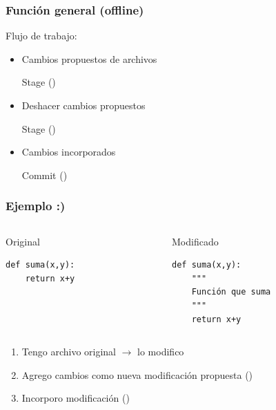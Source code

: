 \documentclass[14pt,aspectratio=169,xcolor=dvipsnames]{beamer}
\begin{document}
\begin{frame}\frametitle{Función general (offline)}
    Flujo de trabajo:
    \begin{itemize}
        \item Cambios propuestos de archivos \phantom{ }
            
            \begin{minipage}{0.35\textwidth}
            \begin{block}{}
                Stage \hfill()
            \end{block}
            \end{minipage}
        \item Deshacer cambios propuestos \phantom{ }
            
            \begin{minipage}{0.35\textwidth}
            \begin{block}{}
                Stage \hfill()
            \end{block}
            \end{minipage}

        \item Cambios incorporados \phantom{ }

            \begin{minipage}{0.35\textwidth}
            \begin{block}{}
                Commit \hfill()
            \end{block}
            \end{minipage}
    \end{itemize}
\end{frame}
\begin{frame}[t,fragile]\frametitle{Ejemplo :)}
  \begin{columns}
    \begin{column}[t]{0.45\textwidth}
        Original
        \begin{verbatim}
def suma(x,y):
    return x+y
        \end{verbatim}
    \end{column}
    \begin{column}[t]{0.45\textwidth}
        Modificado
        \begin{verbatim}
def suma(x,y):
    """
    Función que suma
    """
    return x+y
        \end{verbatim}
    \end{column}
  \end{columns}
    
\begin{enumerate}
    \item Tengo archivo original $\to$ lo modifico
    \item Agrego cambios como nueva modificación propuesta \hfill ()
    \item Incorporo modificación \hfill ()
\end{enumerate}
\end{frame}
\end{document}
